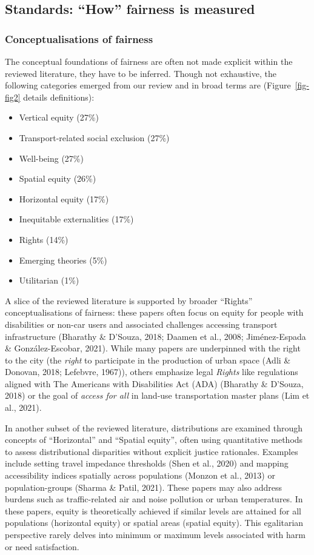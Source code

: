 \documentclass[
  letterpaper,
  DIV=11,
  numbers=noendperiod]{scrartcl}
\begin{document}
\subsection{Standards: ``How'' fairness is
measured}\label{standards-how-fairness-is-measured}

\subsubsection{Conceptualisations of
fairness}\label{conceptualisations-of-fairness}

The conceptual foundations of fairness are often not made explicit
within the reviewed literature, they have to be inferred. Though not
exhaustive, the following categories emerged from our review and in
broad terms are (Figure~\ref{fig-fig2} details definitions):

\begin{itemize}
\item
  Vertical equity (27\%)
\item
  Transport-related social exclusion (27\%)
\item
  Well-being (27\%)
\item
  Spatial equity (26\%)
\item
  Horizontal equity (17\%)
\item
  Inequitable externalities (17\%)
\item
  Rights (14\%)
\item
  Emerging theories (5\%)
\item
  Utilitarian (1\%)
\end{itemize}

A slice of the reviewed literature is supported by broader ``Rights''
conceptualisations of fairness: these papers often focus on equity for
people with disabilities or non-car users and associated challenges
accessing transport infrastructure (Bharathy \& D'Souza, 2018; Daamen et
al., 2008; Jiménez-Espada \& González-Escobar, 2021). While many papers
are underpinned with the right to the city (the \emph{right} to
participate in the production of urban space (Adli \& Donovan, 2018;
Lefebvre, 1967)), others emphasize legal \emph{Rights} like regulations
aligned with The Americans with Disabilities Act (ADA) (Bharathy \&
D'Souza, 2018) or the goal of \emph{access for all} in land-use
transportation master plans (Lim et al., 2021).

In another subset of the reviewed literature, distributions are examined
through concepts of ``Horizontal'' and ``Spatial equity'', often using
quantitative methods to assess distributional disparities without
explicit justice rationales. Examples include setting travel impedance
thresholds (Shen et al., 2020) and mapping accessibility indices
spatially across populations (Monzon et al., 2013) or population-groups
(Sharma \& Patil, 2021). These papers may also address burdens such as
traffic-related air and noise pollution or urban temperatures. In these
papers, equity is theoretically achieved if similar levels are attained
for all populations (horizontal equity) or spatial areas (spatial
equity). This egalitarian perspective rarely delves into minimum or
maximum levels associated with harm or need satisfaction.
\end{document}
